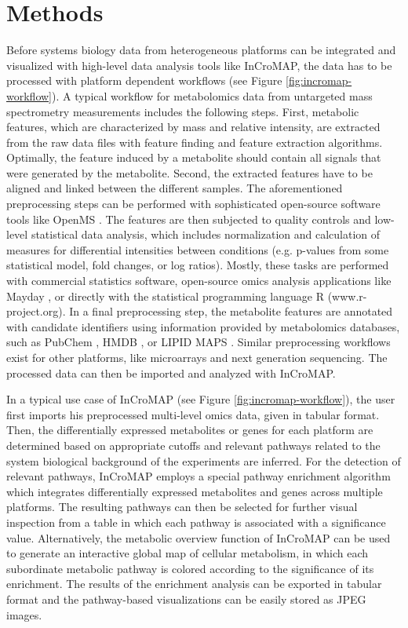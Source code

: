 \documentclass[final,5p,times,twocolumn]{elsarticle}
\begin{document}
\section{Methods}
Before systems biology data from heterogeneous platforms can be integrated and visualized with high-level data analysis tools like InCroMAP, the data has to be processed with platform dependent workflows (see Figure \ref{fig:incromap-workflow}). A typical workflow for metabolomics data from untargeted mass spectrometry measurements includes the following steps. First, metabolic features, which are characterized by mass and relative intensity, are extracted from the raw data files with feature finding and feature extraction algorithms. Optimally, the feature induced by a metabolite should contain all signals that were generated by the metabolite. Second, the extracted features have to be aligned and linked between the different samples. The aforementioned preprocessing steps can be performed with sophisticated open-source software tools like OpenMS \cite{Sturm2008}. The  features are then subjected to quality controls and low-level statistical data analysis, which includes normalization and calculation of measures for differential intensities between conditions (e.g. p-values from some statistical model, fold changes, or log ratios). Mostly, these tasks are performed with commercial statistics software, open-source omics analysis applications like Mayday \cite{Battke2010}, or directly with the statistical programming language R (www.r-project.org). In a final preprocessing step, the metabolite features are annotated with candidate identifiers using information provided by metabolomics databases, such as PubChem \cite{Wang2009}, HMDB \cite{Wishart2009}, or LIPID MAPS \cite{Sud2007}. Similar preprocessing workflows exist for other platforms, like microarrays and next generation sequencing. The processed data can then be imported and analyzed with InCroMAP.

In a typical use case of InCroMAP (see Figure \ref{fig:incromap-workflow}), the user first imports his preprocessed multi-level omics data, given in tabular format. Then, the differentially expressed metabolites or genes for each platform are determined based on appropriate cutoffs and relevant pathways related to the system biological background of the experiments are inferred. For the detection of relevant pathways, InCroMAP employs a special pathway enrichment algorithm which integrates differentially expressed metabolites and genes across multiple platforms. The resulting pathways can then be selected for further visual inspection from a table in which each pathway is associated with a significance value. Alternatively, the metabolic overview function of InCroMAP can be used to generate an interactive global map of cellular metabolism, in which each subordinate metabolic pathway is colored according to the significance of its enrichment. The results of the enrichment analysis can be exported in tabular format and the pathway-based visualizations can be easily stored as JPEG images.
\end{document}
